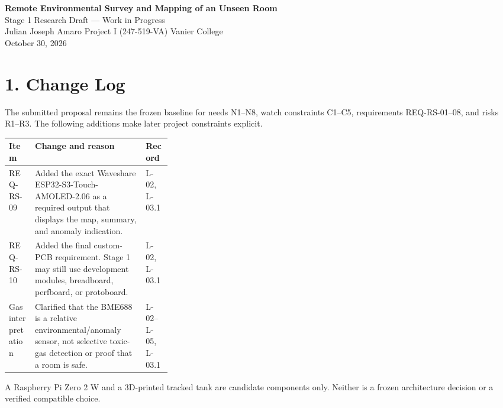 \documentclass[10pt,letterpaper]{article}
\begin{document}
\small

\begin{center}
{\Large\bfseries Remote Environmental Survey and Mapping of an Unseen Room}\\[3pt]
{\large Stage 1 Research Draft --- Work in Progress}\\[4pt]
Julian Joseph Amaro \quad Project I (247-519-VA) \quad Vanier College\\
October 30, 2026
\end{center}

\noindent{}

\section*{1. Change Log}

The submitted proposal remains the frozen baseline for needs N1--N8, watch constraints C1--C5, requirements REQ-RS-01--08, and risks R1--R3. The following additions make later project constraints explicit.

\begin{tabularx}{\linewidth}{>{\raggedright\arraybackslash}p{0.16\linewidth}X>{\raggedright\arraybackslash}p{0.16\linewidth}}
\toprule
\textbf{Item} & \textbf{Change and reason} & \textbf{Record} \\
\midrule
REQ-RS-09 & Added the exact Waveshare ESP32-S3-Touch-AMOLED-2.06 as a required output that displays the map, summary, and anomaly indication. & L-02, L-03.1 \\
REQ-RS-10 & Added the final custom-PCB requirement. Stage 1 may still use development modules, breadboard, perfboard, or protoboard. & L-02, L-03.1 \\
Gas interpretation & Clarified that the BME688 is a relative environmental/anomaly sensor, not selective toxic-gas detection or proof that a room is safe. & L-02--L-05, L-03.1 \\
\bottomrule
\end{tabularx}

A Raspberry Pi Zero 2 W and a 3D-printed tracked tank are candidate components only. Neither is a frozen architecture decision or a verified compatible choice.
\end{document}

